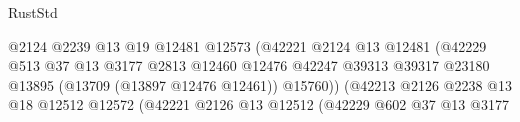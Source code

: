 \begin{lexlean}{RustStd}
\begin{coremodule}
                                                      @2124
                                                      @2239
                                                      @13
                                                      @19
                                                      @12481
                                                      @12573
                                                      (@42221
                                                        @2124
                                                        @13
                                                        @12481
                                                        (@42229
                                                          @513
                                                          @37
                                                          @13
                                                          @3177
                                                          @2813
                                                          @12460
                                                          @12476
                                                          @42247
                                                          @39313
                                                          @39317
                                                          @23180
                                                          @13895
                                                          (@13709 (@13897 @12476 @12461))
                                                          @15760))
                                                      (@42213
                                                        @2126
                                                        @2238
                                                        @13
                                                        @18
                                                        @12512
                                                        @12572
                                                        (@42221
                                                          @2126
                                                          @13
                                                          @12512
                                                          (@42229
                                                            @602
                                                            @37
                                                            @13
                                                            @3177

\end{coremodule}
\end{lexlean}
